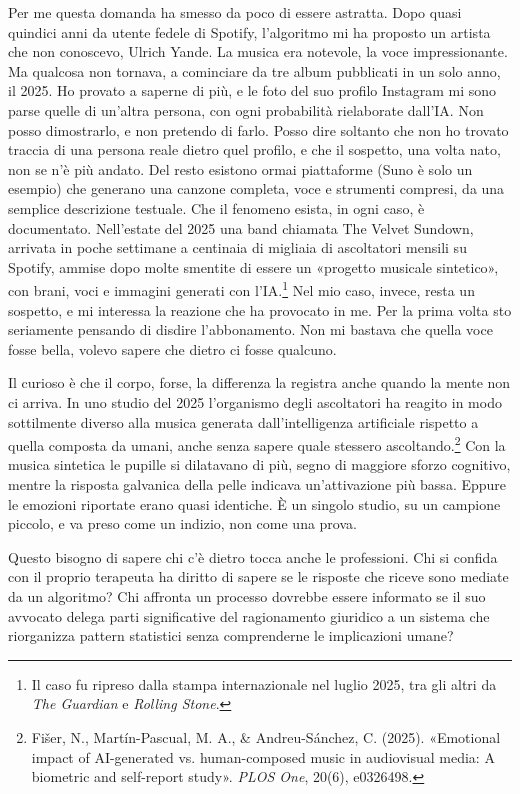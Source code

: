 Per me questa domanda ha smesso da poco di essere astratta. Dopo quasi quindici anni da utente fedele di Spotify, l'algoritmo mi ha proposto un artista che non conoscevo, Ulrich Yande. La musica era notevole, la voce impressionante. Ma qualcosa non tornava, a cominciare da tre album pubblicati in un solo anno, il 2025. Ho provato a saperne di più, e le foto del suo profilo Instagram mi sono parse quelle di un'altra persona, con ogni probabilità rielaborate dall'IA. Non posso dimostrarlo, e non pretendo di farlo. Posso dire soltanto che non ho trovato traccia di una persona reale dietro quel profilo, e che il sospetto, una volta nato, non se n'è più andato. Del resto esistono ormai piattaforme (Suno è solo un esempio) che generano una canzone completa, voce e strumenti compresi, da una semplice descrizione testuale. Che il fenomeno esista, in ogni caso, è documentato. Nell'estate del 2025 una band chiamata The Velvet Sundown, arrivata in poche settimane a centinaia di migliaia di ascoltatori mensili su Spotify, ammise dopo molte smentite di essere un «progetto musicale sintetico», con brani, voci e immagini generati con l'IA.\footnote{Il caso fu ripreso dalla stampa internazionale nel luglio 2025, tra gli altri da \textit{The Guardian} e \textit{Rolling Stone}.} Nel mio caso, invece, resta un sospetto, e mi interessa la reazione che ha provocato in me. Per la prima volta sto seriamente pensando di disdire l'abbonamento. Non mi bastava che quella voce fosse bella, volevo sapere che dietro ci fosse qualcuno.

Il curioso è che il corpo, forse, la differenza la registra anche quando la mente non ci arriva. In uno studio del 2025 l'organismo degli ascoltatori ha reagito in modo sottilmente diverso alla musica generata dall'intelligenza artificiale rispetto a quella composta da umani, anche senza sapere quale stessero ascoltando.\footnote{Fi\v{s}er, N., Mart\'{i}n-Pascual, M. A., \& Andreu-S\'{a}nchez, C. (2025). «Emotional impact of AI-generated vs. human-composed music in audiovisual media: A biometric and self-report study». \textit{PLOS One}, 20(6), e0326498.} Con la musica sintetica le pupille si dilatavano di più, segno di maggiore sforzo cognitivo, mentre la risposta galvanica della pelle indicava un'attivazione più bassa. Eppure le emozioni riportate erano quasi identiche. È un singolo studio, su un campione piccolo, e va preso come un indizio, non come una prova.

Questo bisogno di sapere chi c'è dietro tocca anche le professioni. Chi si confida con il proprio terapeuta ha diritto di sapere se le risposte che riceve sono mediate da un algoritmo? Chi affronta un processo dovrebbe essere informato se il suo avvocato delega parti significative del ragionamento giuridico a un sistema che riorganizza pattern statistici senza comprenderne le implicazioni umane?

